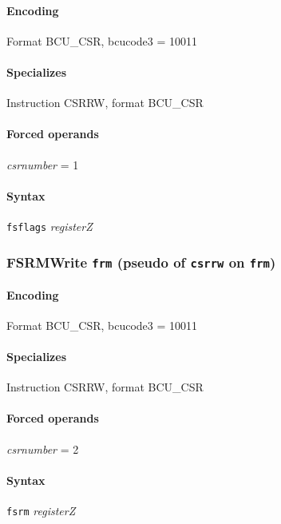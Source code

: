 {\paragraph{Encoding} Format \textsf{BCU\_CSR, bcucode3 = 10011}\\



\paragraph{Specializes} Instruction CSRRW, format BCU\_CSR

\paragraph{Forced operands} \emph{csrnumber} = 1

\paragraph{Syntax} \texttt{fsflags} \emph{registerZ}
\newpage
\subsubsection[{\small FSRM: Write \texttt{frm} (pseudo of \texttt{csrrw} on \texttt{frm})}]{FSRM\hfill Write \texttt{frm} (pseudo of \texttt{csrrw} on \texttt{frm})}
\label{instr:FSRM}

\paragraph{Encoding} Format \textsf{BCU\_CSR, bcucode3 = 10011}\\



\paragraph{Specializes} Instruction CSRRW, format BCU\_CSR

\paragraph{Forced operands} \emph{csrnumber} = 2

\paragraph{Syntax} \texttt{fsrm} \emph{registerZ}
\newpage
\subsubsectionfont{}
}
